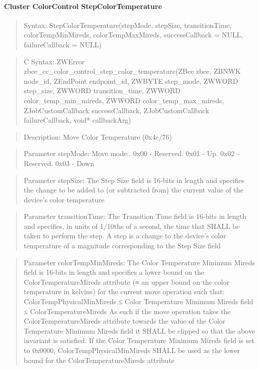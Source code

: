 \paragraph{Cluster ColorControl StepColorTemperature}
\begin{quote}Syntax: StepColorTemperature(stepMode, stepSize, transitionTime, colorTempMinMireds, colorTempMaxMireds, successCallback = NULL, failureCallback = NULL)\end{quote}
\begin{quote}C Syntax: ZWError zbee\_cc\_color\_control\_step\_color\_temperature(ZBee zbee, ZBNWK node\_id, ZEndPoint endpoint\_id, ZWBYTE step\_mode, ZWWORD step\_size, ZWWORD transition\_time, ZWWORD color\_temp\_min\_mireds, ZWWORD color\_temp\_max\_mireds, ZJobCustomCallback successCallback, ZJobCustomCallback failureCallback, void* callbackArg)\end{quote}
\begin{quote}Description: Move Color Temperature (0x4c/76)\end{quote}
\begin{quote}Parameter stepMode: Move mode:. 0x00 - Reserved. 0x01 - Up. 0x02 - Reserved. 0x03 - Down\end{quote}
\begin{quote}Parameter stepSize: The Step Size field is 16-bits in length and specifies the change to be added to (or subtracted from) the current value of the device’s color temperature\end{quote}
\begin{quote}Parameter transitionTime: The Transition Time field is 16-bits in length and specifies, in units of 1/10ths of a second, the time that SHALL be taken to perform the step. A step is a change to the device’s color temperature of a magnitude corresponding to the Step Size field\end{quote}
\begin{quote}Parameter colorTempMinMireds: The Color Temperature Minimum Mireds field is 16-bits in length and specifies a lower bound on the ColorTemperatureMireds attribute (≡ an upper bound on the color temperature in kelvins) for the current move operation such that: ColorTempPhysicalMinMireds ≤ Color Temperature Minimum Mireds field ≤ ColorTemperatureMireds As such if the move operation takes the ColorTemperatureMireds attribute towards the value of the Color Temperature Minimum Mireds field it SHALL be clipped so that the above invariant is satisfied. If the Color Temperature Minimum Mireds field is set to 0x0000, ColorTempPhysicalMinMireds SHALL be used as the lower bound for the ColorTemperatureMireds attribute\end{quote}

